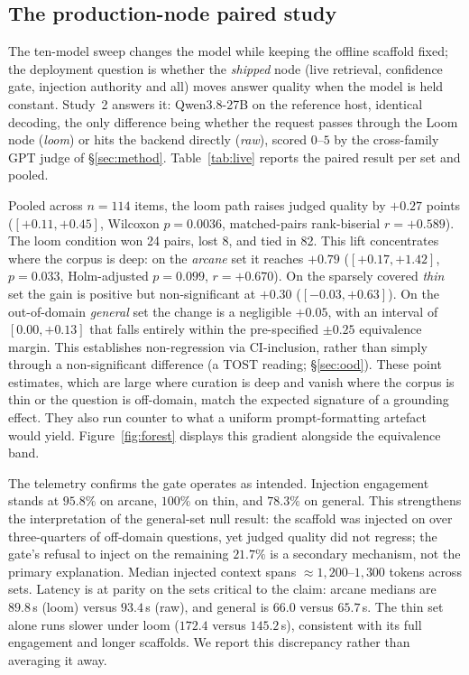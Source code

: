 \documentclass[10pt,twocolumn]{article}
\begin{document}
\subsection{The production-node paired study}\label{sec:live}
The ten-model sweep changes the model while keeping the offline scaffold fixed; the deployment question is whether the \emph{shipped} node (live retrieval, confidence gate, injection authority and all) moves answer quality when the model is held constant. Study~2 answers it: Qwen3.8-27B on the reference host, identical decoding, the only difference being whether the request passes through the Loom node (\emph{loom}) or hits the backend directly (\emph{raw}), scored $0$--$5$ by the cross-family GPT judge of \S\ref{sec:method}. Table~\ref{tab:live} reports the paired result per set and pooled.

Pooled across $n=114$ items, the loom path raises judged quality by $\mathbf{+0.27}$ points ($[+0.11,+0.45]$, Wilcoxon $p=0.0036$, matched-pairs rank-biserial $r=+0.589$). The loom condition won 24 pairs, lost 8, and tied in 82. This lift concentrates where the corpus is deep: on the \emph{arcane} set it reaches $\mathbf{+0.79}$ ($[+0.17,+1.42]$, $p=0.033$, Holm-adjusted $p=0.099$, $r=+0.670$). On the sparsely covered \emph{thin} set the gain is positive but non-significant at $+0.30$ ($[-0.03,+0.63]$). On the out-of-domain \emph{general} set the change is a negligible $+0.05$, with an interval of $[0.00,+0.13]$ that falls entirely within the pre-specified $\pm0.25$ equivalence margin. This establishes non-regression via CI-inclusion, rather than simply through a non-significant difference (a TOST reading; \S\ref{sec:ood}). These point estimates, which are large where curation is deep and vanish where the corpus is thin or the question is off-domain, match the expected signature of a grounding effect. They also run counter to what a uniform prompt-formatting artefact would yield. Figure~\ref{fig:forest} displays this gradient alongside the equivalence band.



The telemetry confirms the gate operates as intended. Injection engagement stands at $95.8\%$ on arcane, $100\%$ on thin, and $78.3\%$ on general. This strengthens the interpretation of the general-set null result: the scaffold was injected on over three-quarters of off-domain questions, yet judged quality did not regress; the gate’s refusal to inject on the remaining $21.7\%$ is a secondary mechanism, not the primary explanation. Median injected context spans $\approx1{,}200$--$1{,}300$ tokens across sets. Latency is at parity on the sets critical to the claim: arcane medians are $89.8$\,s (loom) versus $93.4$\,s (raw), and general is $66.0$ versus $65.7$\,s. The thin set alone runs slower under loom ($172.4$ versus $145.2$\,s), consistent with its full engagement and longer scaffolds. We report this discrepancy rather than averaging it away.
\end{document}
